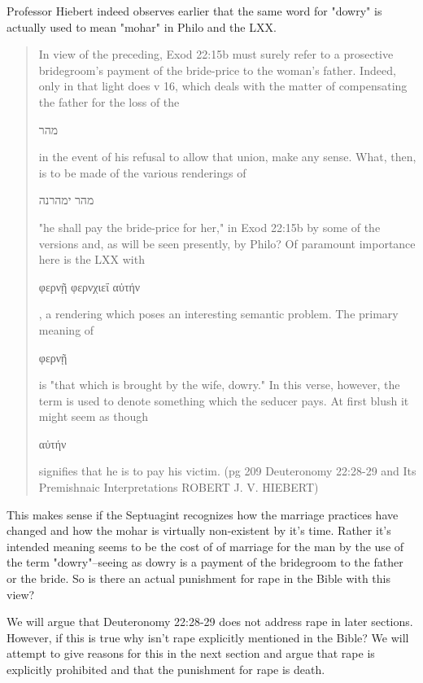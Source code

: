 \documentclass[11pt]{article}
\begin{document}
Professor Hiebert indeed observes earlier that the same word for "dowry" is actually used to mean "mohar" in Philo and the LXX. 
\begin{quote}
In view of the preceding, Exod 22:15b must surely refer to a prosective bridegroom's payment of the bride-price to the woman's father. Indeed, only in that light does v 16, which deals with the matter of compensating the father for the loss of the\begin{hebrew}מהר\end{hebrew} in the event of his refusal to allow that union, make any sense. What, then, is to be made of the various renderings of \begin{hebrew} מהר ימהרנה \end{hebrew} "he shall pay the bride-price for her," in Exod 22:15b by some of the versions and, as will be seen presently, by Philo? Of paramount importance here is the LXX with \begin{greek}φερνῇ φερνχιεΐ αὐτήν\end{greek}, a rendering which poses an interesting semantic problem. The primary meaning of \begin{greek}φερνῇ\end{greek} is "that which is brought by the wife, dowry." In this verse, however, the term is used to denote something which the seducer pays. At first blush it might seem as though \begin{greek}αὐτήν\end{greek} signifies that he is to pay his victim. (pg 209 Deuteronomy 22:28-29 and Its Premishnaic Interpretations
ROBERT J. V. HIEBERT)
\end{quote}
This makes sense if the Septuagint recognizes how the marriage practices have changed and how the mohar is virtually non-existent by it's time. Rather it's intended meaning seems to be the cost of of marriage for the man by the use of the term "dowry"--seeing as dowry is a payment of the bridegroom to the father or the bride.
 So is there an actual punishment for rape in the Bible with this view?

We will argue that Deuteronomy 22:28-29 does not address rape in later sections. However, if this is true why isn't rape explicitly mentioned in the Bible? We will attempt to give reasons for this in the next section and argue that rape is explicitly prohibited and that the punishment for rape is death.
\end{document}
